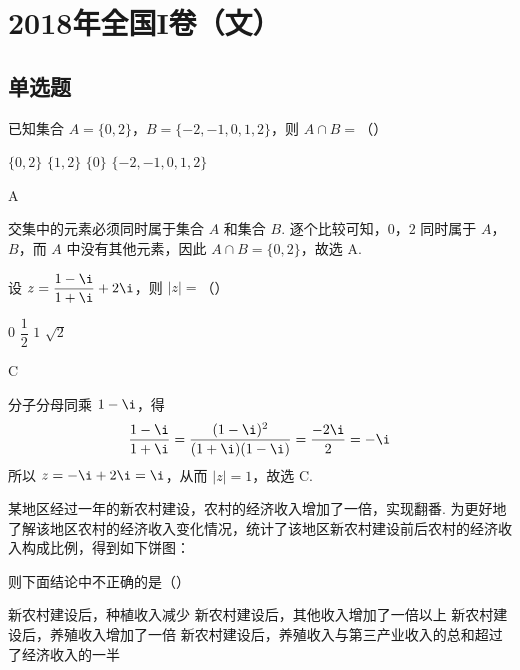 

\chapter{2018年全国I卷（文）}

\section{单选题}

\begin{problem}
已知集合 \(A=\{0,2\}\)，\(B=\{-2,-1,0,1,2\}\)，则 \(A\cap B=\)（\quad）

\choices
    {\(\{0,2\}\)}
    {\(\{1,2\}\)}
    {\(\{0\}\)}
    {\(\{-2,-1,0,1,2\}\)}
\end{problem}

\begin{answer}
A
\end{answer}

\begin{solution}
交集中的元素必须同时属于集合 \(A\) 和集合 \(B\). 逐个比较可知，\(0\)，\(2\) 同时属于 \(A\)，\(B\)，而 \(A\) 中没有其他元素，因此 \(A\cap B=\{0,2\}\)，故选 A.
\end{solution}

\begin{problem}
设 \(z=\dfrac{1-\i}{1+\i}+2\i\)，则 \(|z|=\)（\quad）

\choices
    {\(0\)}
    {\(\dfrac12\)}
    {\(1\)}
    {\(\sqrt2\)}
\end{problem}

\begin{answer}
C
\end{answer}

\begin{solution}
分子分母同乘 \(1-\i\)，得
\[
\frac{1-\i}{1+\i}=\frac{(1-\i)^2}{(1+\i)(1-\i)}=\frac{-2\i}{2}=-\i
\]
所以 \(z=-\i+2\i=\i\)，从而 \(|z|=1\)，故选 C.
\end{solution}

\begin{problem}
某地区经过一年的新农村建设，农村的经济收入增加了一倍，实现翻番. 为更好地了解该地区农村的经济收入变化情况，统计了该地区新农村建设前后农村的经济收入构成比例，得到如下饼图：


则下面结论中不正确的是（\quad）

\choices
    {新农村建设后，种植收入减少}
    {新农村建设后，其他收入增加了一倍以上}
    {新农村建设后，养殖收入增加了一倍}
    {新农村建设后，养殖收入与第三产业收入的总和超过了经济收入的一半}
\end{problem}

